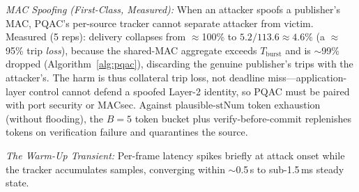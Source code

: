 \documentclass[journal]{IEEEtran}
\begin{document}
\begin{table}[t]
\centering
\caption{Multi-Source Random-MAC Flood on Emulated Relay ($\overline{S}=573\,\mu$s, 100K\,pps, 5 reps): Priority Preserves Trip Delivery}
\label{tab:multisource}
\scriptsize
{}
\end{table}

\textit{MAC Spoofing (First-Class, Measured):} When an attacker spoofs a publisher's MAC, PQAC's per-source tracker cannot separate attacker from victim. Measured (5 reps): delivery collapses from $\approx$100\% to $5.2/113.6\approx 4.6\%$ (a $\approx$95\% trip \emph{loss}), because the shared-MAC aggregate exceeds $T_{\text{burst}}$ and is $\sim$99\% dropped (Algorithm~\ref{alg:pqac}), discarding the genuine publisher's trips with the attacker's. The harm is thus collateral trip loss, not deadline miss---application-layer control cannot defend a spoofed Layer-2 identity, so PQAC must be paired with port security or MACsec. Against plausible-$\text{stNum}$ token exhaustion (without flooding), the $B=5$ token bucket plus verify-before-commit replenishes tokens on verification failure and quarantines the source.

\textit{The Warm-Up Transient:} Per-frame latency spikes briefly at attack onset while the tracker accumulates samples, converging within $\sim$0.5\,s to sub-1.5\,ms steady state.

\end{document}
